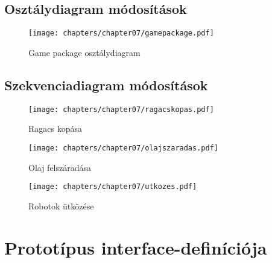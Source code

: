 \clearpage

\subsection{Osztálydiagram módosítások}
\begin{figure}[h]
	\begin{center}
		\texttt{[image: chapters/chapter07/gamepackage.pdf]}
		\caption{Game package osztálydiagram}
		\label{Game package osztálydiagram}
	\end{center}
\end{figure}

\clearpage


\subsection{Szekvenciadiagram módosítások}
\begin{figure}[h]
	\begin{center}
		\texttt{[image: chapters/chapter07/ragacskopas.pdf]}
		\caption{Ragacs kopása}
		\label{Ragacs kopása}
	\end{center}
\end{figure}

\clearpage

\begin{figure}[h]
	\begin{center}
		\texttt{[image: chapters/chapter07/olajszaradas.pdf]}
		\caption{Olaj felszáradása}
		\label{Olaj felszáradása}
	\end{center}
\end{figure}

\clearpage

\begin{figure}[h]
	\begin{center}
		\texttt{[image: chapters/chapter07/utkozes.pdf]}
		\caption{Robotok ütközése}
		\label{Robotok ütközése}
	\end{center}
\end{figure}

\clearpage


\section{Prototípus interface-definíciója}

